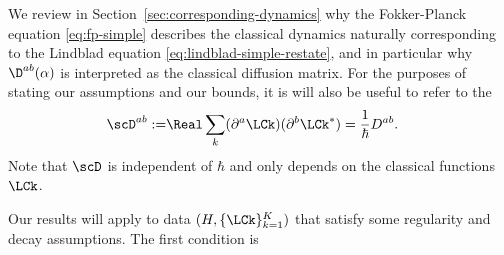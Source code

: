 \documentclass{article}
\numberwithin{equation}{section}
\begin{document}
We review\cite{strunz1998classical,bondar2016wigner,dubois2021semiclassical} in Section~\ref{sec:corresponding-dynamics} why the Fokker-Planck equation \eqref{eq:fp-simple} describes the classical dynamics naturally corresponding to the Lindblad equation \eqref{eq:lindblad-simple-restate}, and in particular why $\D^{ab}(\alpha)$ is interpreted as the classical diffusion matrix.  For the purposes of stating our
assumptions and our bounds, it is will also be useful to refer to the 
\begin{align}
\label{eq:delta-def}
    \scD^{ab}:=& \Real \sum_k (\partial^a \LCk)(\partial^b \LCk^*) = \frac{1}{\hbar} D^{ab}.
\end{align}
Note that $\scD$ is independent of $\hbar$ and only depends on the classical
functions $\LCk$.

Our results will apply to data $(H,\{\LCk\}_{k=1}^K)$ that satisfy some regularity and decay assumptions.   The first condition is 
\end{document}
